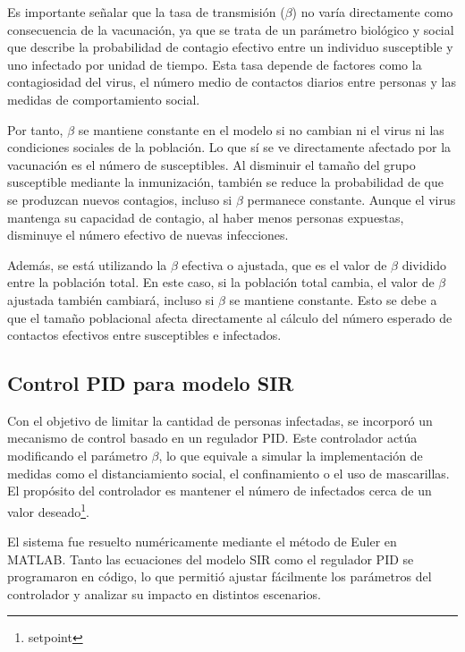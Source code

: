 Es importante señalar que la tasa de transmisión ($\beta$) no varía directamente como consecuencia de la vacunación, ya que se trata de un parámetro biológico y social que describe la probabilidad de contagio efectivo entre un individuo susceptible y uno infectado por unidad de tiempo. Esta tasa depende de factores como la contagiosidad del virus, el número medio de contactos diarios entre personas y las medidas de comportamiento social.

Por tanto, $\beta$ se mantiene constante en el modelo si no cambian ni el virus ni las condiciones sociales de la población. Lo que sí se ve directamente afectado por la vacunación es el número de susceptibles. Al disminuir el tamaño del grupo susceptible mediante la inmunización, también se reduce la probabilidad de que se produzcan nuevos contagios, incluso si $\beta$ permanece constante. Aunque el virus mantenga su capacidad de contagio, al haber menos personas expuestas, disminuye el número efectivo de nuevas infecciones.

Además, se está utilizando la $\beta$ efectiva o ajustada, que es el valor de $\beta$ dividido entre la población total. En este caso, si la población total cambia, el valor de $\beta$ ajustada también cambiará, incluso si $\beta$ se mantiene constante. Esto se debe a que el tamaño poblacional afecta directamente al cálculo del número esperado de contactos efectivos entre susceptibles e infectados.


\subsection{Control PID para modelo SIR}
Con el objetivo de limitar la cantidad de personas infectadas, se incorporó un mecanismo de control basado en un regulador PID. Este controlador actúa modificando el parámetro $\beta$, lo que equivale a simular la implementación de medidas como el distanciamiento social, el confinamiento o el uso de mascarillas. El propósito del controlador es mantener el número de infectados cerca de un valor deseado\footnote{setpoint}.

El sistema fue resuelto numéricamente mediante el método de Euler en MATLAB. Tanto las ecuaciones del modelo SIR como el regulador PID se programaron en código, lo que permitió ajustar fácilmente los parámetros del controlador y analizar su impacto en distintos escenarios.

